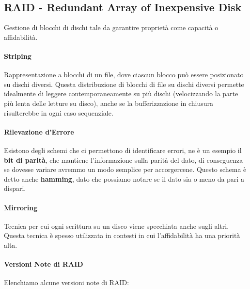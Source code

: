\documentclass{article}
\begin{document}
\newpage

\subsection{RAID - Redundant Array of Inexpensive Disk}

Gestione di blocchi di dischi tale da garantire proprietà come capacità o affidabilità. 

\paragraph{Striping} Rappresentazione a blocchi di un file, dove ciascun blocco può essere posizionato su dischi diversi. Questa distribuzione di blocchi di file su dischi diversi permette idealmente di leggere contemporaneamente su più dischi (velocizzando la parte più lenta delle letture su disco),
 anche se la bufferizzazione in chiusura risulterebbe in ogni caso sequenziale.

\paragraph{Rilevazione d'Errore} Esistono degli schemi che ci permettono di identificare errori, ne è un esempio il \textbf{bit di parità}, che mantiene l'informazione sulla parità del dato, di conseguenza se dovesse variare avremmo un modo semplice per accorgercene. Questo schema è detto anche \textbf{hamming}, dato che possiamo notare se il dato sia o meno da pari a dispari.

\paragraph{Mirroring} Tecnica per cui ogni scrittura su un disco viene specchiata anche sugli altri. Questa tecnica è spesso utilizzata in contesti in cui l'affidabilità ha una priorità alta.

\paragraph{Versioni Note di RAID} Elenchiamo alcune versioni note di RAID:
\end{document}

